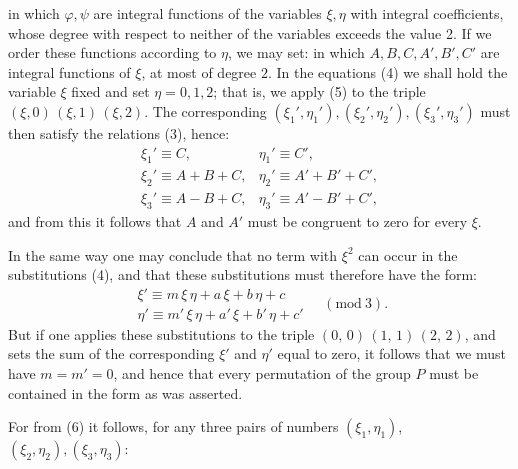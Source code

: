 
in which $\varphi, \psi$ are integral functions of the variables $\xi, \eta$
with integral coefficients, whose degree with respect to neither of the variables
exceeds the value 2. If we order these functions according to $\eta$, we may
set:
in which $A, B, C, A', B', C'$ are integral functions of $\xi$, at most
of degree $2$. In the equations (4) we shall hold the
variable $\xi$ fixed and set $\eta = 0, 1, 2$; that is, we apply
(5) to the triple $(\xi, 0)\,(\xi, 1)\,(\xi, 2)$. The corresponding
$(\xi_1', \eta_1'), (\xi_2', \eta_2'), (\xi_3', \eta_3')$ must then satisfy the relations (3),
hence:
\[
\begin{array}{ll}
\xi_1' \equiv C, & \eta_1' \equiv C',\\
\xi_2' \equiv A + B + C, & \eta_2' \equiv A' + B' + C',\\
\xi_3' \equiv A - B + C, & \eta_3' \equiv A' - B' + C',
\end{array}
\]
and from this it follows that $A$ and $A'$ must be congruent to
zero for every $\xi$.

In the same way one may conclude that no term with $\xi^2$ can
occur in the substitutions (4), and that these substitutions
 must therefore have the form:
\[
\begin{array}{l}
\xi' \equiv m\,\xi\,\eta + a\,\xi + b\,\eta + c\\
\eta' \equiv m'\,\xi\,\eta + a'\,\xi + b'\,\eta + c'
\end{array} \quad (\mathrm{mod}\ 3).
\]
But if one applies these substitutions to the triple $(0,\,0)\,(1,\,1)\,(2,\,2)$,
and sets the sum of the corresponding $\xi'$ and $\eta'$ equal to
zero, it follows that we must have $m = m' = 0$, and hence that
every permutation of the group $P$ must be contained in the form
as was asserted.


For from (6) it follows, for any three pairs of numbers $(\xi_1, \eta_1)$,
$(\xi_2, \eta_2), (\xi_3, \eta_3)$:
